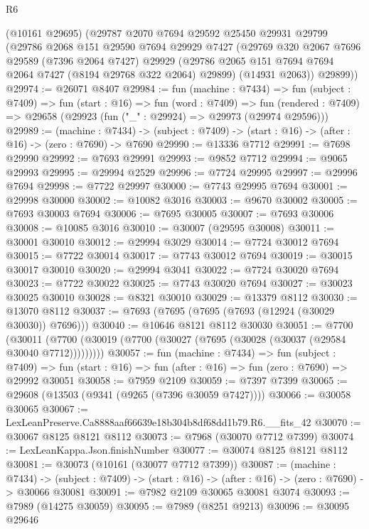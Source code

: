 \begin{lexlean}{R6}
\begin{coremodule}
    (@10161 @29695)
    (@29787
      @2070
      @7694
      @29592
      @25450
      @29931
      @29799
      (@29786
        @2068
        @151
        @29590
        @7694
        @29929
        @7427
        (@29769
          @320
          @2067
          @7696
          @29589
          (@7396 @2064 @7427)
          @29929
          (@29786 @2065 @151 @7694 @7694 @2064 @7427 (@8194 @29768 @322 @2064) @29899)
          (@14931 @2063))
        @29899))
@29974 := @26071 @8407
@29984 := fun (machine : @7434) =>
  fun (subject : @7409) =>
  fun (start : @16) =>
  fun (word : @7409) =>
  fun (rendered : @7409) => @29658 (@29923 (fun ("_" : @29924) => @29973 (@29974 @29596)))
@29989 := (machine : @7434) ->
  (subject : @7409) -> (start : @16) -> (after : @16) -> (zero : @7690) -> @7690
@29990 := @13336 @7712
@29991 := @7698 @29990
@29992 := @7693 @29991
@29993 := @9852 @7712
@29994 := @9065 @29993
@29995 := @29994 @2529
@29996 := @7724 @29995
@29997 := @29996 @7694
@29998 := @7722 @29997
@30000 := @7743 @29995 @7694
@30001 := @29998 @30000
@30002 := @10082 @3016
@30003 := @9670 @30002
@30005 := @7693 @30003 @7694
@30006 := @7695 @30005
@30007 := @7693 @30006
@30008 := @10085 @3016
@30010 := @30007 (@29595 @30008)
@30011 := @30001 @30010
@30012 := @29994 @3029
@30014 := @7724 @30012 @7694
@30015 := @7722 @30014
@30017 := @7743 @30012 @7694
@30019 := @30015 @30017 @30010
@30020 := @29994 @3041
@30022 := @7724 @30020 @7694
@30023 := @7722 @30022
@30025 := @7743 @30020 @7694
@30027 := @30023 @30025 @30010
@30028 := @8321 @30010
@30029 := @13379 @8112
@30030 := @13070 @8112
@30037 := @7693 (@7695 (@7695 (@7693 (@12924 (@30029 @30030)) @7696)))
@30040 := @10646 @8121 @8112 @30030
@30051 := @7700
    (@30011 (@7700 (@30019 (@7700 (@30027 (@7695 (@30028 (@30037 (@29584 @30040 @7712)))))))))
@30057 := fun (machine : @7434) =>
  fun (subject : @7409) =>
  fun (start : @16) => fun (after : @16) => fun (zero : @7690) => @29992 @30051
@30058 := @7959 @2109
@30059 := @7397 @7399
@30065 := @29608 (@13503 (@9341 (@9265 (@7396 @30059 @7427))))
@30066 := @30058 @30065
@30067 := LexLeanPreserve.Ca8888aaf66639e18b304b8df68dd1b79.R6.__fits_42
@30070 := @30067 @8125 @8121 @8112
@30073 := @7968 (@30070 @7712 @7399)
@30074 := LexLeanKappa.Json.finishNumber
@30077 := @30074 @8125 @8121 @8112
@30081 := @30073 (@10161 (@30077 @7712 @7399))
@30087 := (machine : @7434) ->
  (subject : @7409) -> (start : @16) -> (after : @16) -> (zero : @7690) -> @30066 @30081
@30091 := @7982 @2109 @30065 @30081 @3074
@30093 := @7989 (@14275 @30059)
@30095 := @7989 (@8251 @9213)
@30096 := @30095 @29646

\end{coremodule}
\end{lexlean}
